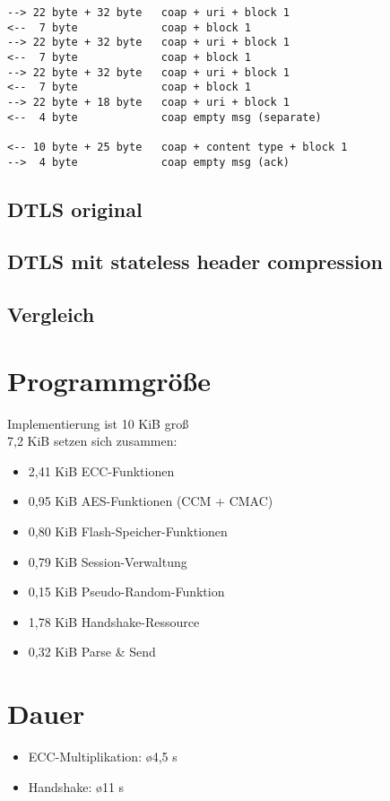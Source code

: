 \begin{verbatim}
--> 22 byte + 32 byte   coap + uri + block 1
<--  7 byte             coap + block 1
--> 22 byte + 32 byte   coap + uri + block 1
<--  7 byte             coap + block 1
--> 22 byte + 32 byte   coap + uri + block 1
<--  7 byte             coap + block 1
--> 22 byte + 18 byte   coap + uri + block 1
<--  4 byte             coap empty msg (separate)

<-- 10 byte + 25 byte   coap + content type + block 1
-->  4 byte             coap empty msg (ack)
\end{verbatim}

\subsection{DTLS original}

\subsection{DTLS mit stateless header compression}

\subsection{Vergleich}

\section{Programmgröße}

Implementierung ist 10 KiB groß\\
7,2 KiB setzen sich zusammen: 
\begin{itemize}
  \item 2,41 KiB ECC-Funktionen
  \item 0,95 KiB AES-Funktionen (CCM + CMAC)
  \item 0,80 KiB Flash-Speicher-Funktionen
  \item 0,79 KiB Session-Verwaltung
  \item 0,15 KiB Pseudo-Random-Funktion
  \item 1,78 KiB Handshake-Ressource
  \item 0,32 KiB Parse \& Send
\end{itemize}

\section{Dauer}

\begin{itemize}
  \item ECC-Multiplikation: \o 4,5 s
  \item Handshake: \o 11 s
\end{itemize}